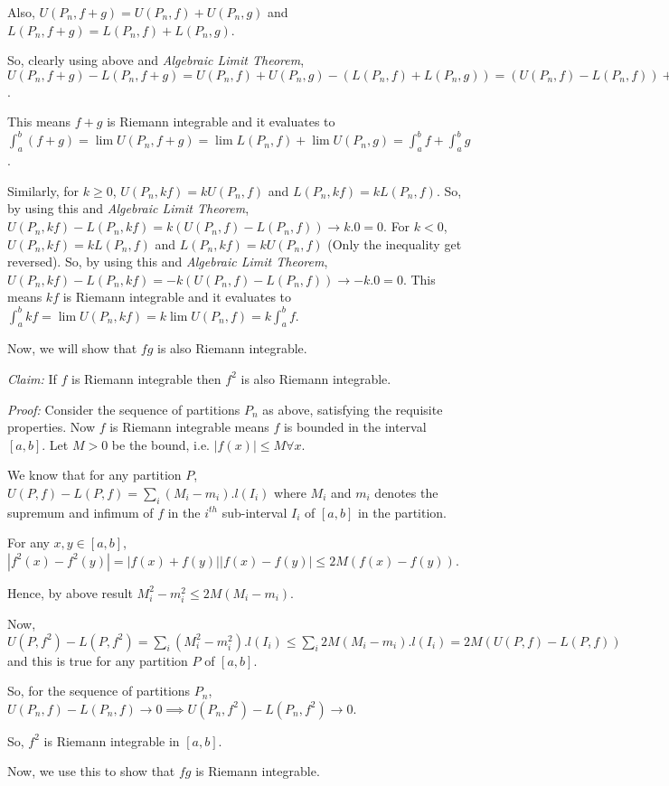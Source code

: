 \documentclass[11pt]{amsart}
\theoremstyle{definition}
\begin{document}
\begin{enumerate}[wide, labelwidth=!, labelindent=0pt]
\begin{enumerate}[label=(\alph*)]
Also, $U(P_n,f+g) = U(P_n,f) + U(P_n,g)$ and $L(P_n,f+g) = L(P_n,f) + L(P_n,g)$.

So, clearly using above and \textit{Algebraic Limit Theorem}, $U(P_n,f+g) - L(P_n,f+g) = U(P_n,f) + U(P_n,g) - (L(P_n,f) + L(P_n,g)) = (U(P_{n},f)-L(P_{n},f)) + (U(P_{n},g)-L(P_{n},g)) \to 0 + 0 = 0$.

This means $f+g$ is Riemann integrable and it evaluates to $\int_a^b (f+g) = \lim U(P_n,f+g) = \lim L(P_n,f) + \lim U(P_n,g) = \int_a^b f + \int_a^b g$.

Similarly, for $k \ge 0$, $U(P_n,k f) = k U(P_n,f)$ and $L(P_n,k f) = k L(P_n,f)$. So, by using this and \textit{Algebraic Limit Theorem}, $U(P_n,k f) - L(P_n,k f) = k (U(P_{n},f)-L(P_{n},f)) \to k.0 = 0$. For $k < 0$, $U(P_n,k f) = k L(P_n,f)$ and $L(P_n,k f) = k U(P_n,f)$ (Only the inequality get reversed). So, by using this and \textit{Algebraic Limit Theorem}, $U(P_n,k f) - L(P_n,k f) = -k (U(P_{n},f)-L(P_{n},f)) \to -k.0 = 0$. This means $k f$ is Riemann integrable and it evaluates to $\int_a^b k f = \lim U(P_n,k f) = k \lim U(P_n,f) = k \int_a^b f$.

Now, we will show that $f g$ is also Riemann integrable.

\textit{Claim:} If $f$ is Riemann integrable then $f^2$ is also Riemann integrable.

\textit{Proof:} Consider the sequence of partitions $P_n$ as above, satisfying the requisite properties. Now $f$ is Riemann integrable means $f$ is bounded in the interval $[a,b]$. Let $M>0$ be the bound, i.e. $|f(x)| \le M \forall x$.

We know that for any partition $P$, $U(P,f) - L(P,f) = \sum_i (M_i - m_i).l(I_i)$ where $M_i$ and $m_i$ denotes the supremum and infimum of $f$ in the $i^{th}$ sub-interval $I_i$ of $[a,b]$ in the partition.

For any $x,y \in [a,b]$, $|f^2 (x) - f^2 (y)| = |f(x) + f(y)||f(x) - f(y)| \le 2M (f(x) - f(y))$.

Hence, by above result $M_i^2 - m_i^2 \le 2M (M_i - m_i)$.

Now, $U(P,f^2) - L(P,f^2) = \sum_i (M_i^2 - m_i^2).l(I_i) \le \sum_i 2M (M_i - m_i).l(I_i) = 2M (U(P,f) - L(P,f))$ and this is true for any partition $P$ of $[a,b]$.

So, for the sequence of partitions $P_n$, $U(P_{n},f)-L(P_{n},f) \to 0 \implies U(P_{n},f^2)-L(P_{n},f^2) \to 0$.

So, $f^2$ is Riemann integrable in $[a,b]$.

Now, we use this to show that $f g$ is Riemann integrable.


\end{enumerate}
\end{enumerate}
\end{document}
